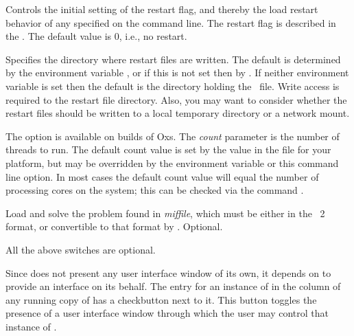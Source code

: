 \begin{description}
  Controls the initial setting of the restart flag, and thereby 
  the load restart behavior of any  specified on the command
  line.  The restart flag is described in the
  .
  The default value is 0, i.e., no restart.
\item[\optkey{-restartfiledir dir}]
  Specifies the directory where restart files are written.
  The default is determined by the environment variable
  ,
  or if this is not set then by
  .  If
  neither environment variable is set then the default is the
  directory holding the \MIF\ file.  Write access is required to the
  restart file directory.  Also, you may want to consider whether the
  restart files should be written to a local temporary directory or a
  network mount.
\item[\optkey{-threads \boa count\bca}]
  The option is available on
   builds of Oxs.
  The \textit{count} parameter is the number of threads to run.  The
  default count value is set by the  value in
  the  file for your platform, but may be
  overridden by the
  environment variable or this command line option.  In most cases the
  default count value will equal the number of processing cores on the
  system; this can be checked via the command
  .
\item[\optkey{miffile}]
  Load and solve the problem found in \textit{miffile}, which must be
  either in the \MIF~2 format, or convertible to that format by 
  .  Optional.
\end{description}
All the above switches are optional.

Since  does not present
any user interface window of its own, it depends on
 to provide an interface on
its behalf.  The entry for an instance of  in the
 column of any running copy of
 has a checkbutton next to it.  This button toggles the
presence of a user interface window through which the user may control
that instance of .



